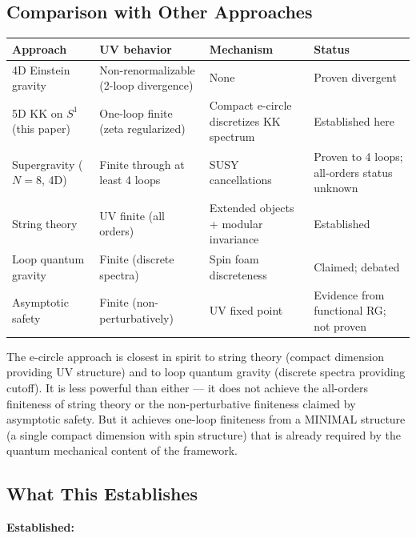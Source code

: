 \documentclass[aps,prd,preprint,superscriptaddress,longbibliography,floatfix]{revtex4-2}
\theoremstyle{remark}
\begin{document}
\subsection{Comparison with Other Approaches}


\begin{table}[H]
\begin{ruledtabular}
\begin{tabular}{p{3.8cm}p{3.8cm}p{3.8cm}p{3.8cm}}
Approach & UV behavior & Mechanism & Status \\
\hline
4D Einstein gravity & Non-renormalizable (2-loop divergence) & None & Proven divergent \\
5D KK on $S^{1}$ (this paper) & One-loop finite (zeta regularized) & Compact e-circle discretizes KK spectrum & Established here \\
Supergravity ($N=8$, 4D) & Finite through at least 4 loops & SUSY cancellations & Proven to 4 loops; all-orders status unknown \\
String theory & UV finite (all orders) & Extended objects + modular invariance & Established \\
Loop quantum gravity & Finite (discrete spectra) & Spin foam discreteness & Claimed; debated \\
Asymptotic safety & Finite (non-perturbatively) & UV fixed point & Evidence from functional RG; not proven \\
\end{tabular}
\end{ruledtabular}
\end{table}

The e-circle approach is closest in spirit to string theory (compact dimension providing UV structure) and to loop quantum gravity (discrete spectra providing cutoff). It is less powerful than either --- it does not achieve the all-orders finiteness of string theory or the non-perturbative finiteness claimed by asymptotic safety. But it achieves one-loop finiteness from a MINIMAL structure (a single compact dimension with spin structure) that is already required by the quantum mechanical content of the framework.



\subsection{What This Establishes}

\textbf{Established:}
\end{document}
